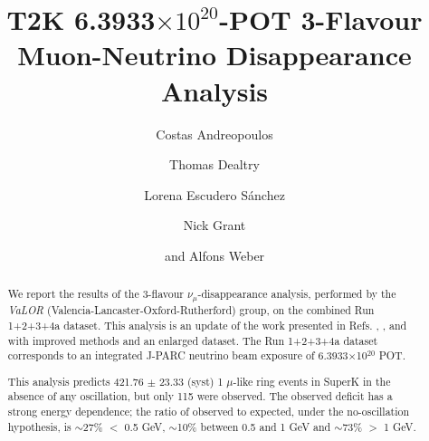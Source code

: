 %
%

\begin{frontmatter}

\title{
  T2K 6.3933$\times10^{20}$-POT 3-Flavour Muon-Neutrino Disappearance Analysis
}

\vspace*{0.7cm}

\author[RAL]     {Costas Andreopoulos}
\author[RAL,OXF] {Thomas Dealtry}
\author[IFIC]    {Lorena Escudero S\'anchez}
\author[LANCS]   {Nick Grant}
\author[RAL,OXF] {and Alfons Weber}

\address[RAL]{Particle Physics Dept., Rutherford Appleton Laboratory, STFC \\
              Harwell Oxford Campus\\
              Oxfordshire OX11 0QX, UK}

\address[OXF]{Subdepartment of Particle Physics, University of Oxford \\
              Denys Wilkinson Building, Keble Road\\
              Oxfordshire OX1 3RH, UK}

\address[IFIC]{Instituto de Fisica Corpuscular\\
              CSIC and University of Valencia\\
              Valencia, Spain}

\address[LANCS]{Physics Dept., Lancaster University \\
              Lancaster, LA1 4YB, UK}

%
%

\begin{abstract}

We report the results of the
3-flavour $\nu_{\mu}$-disappearance analysis,
performed by the {\em VaLOR} (Valencia-Lancaster-Oxford-Rutherford) group,
on the combined Run 1+2+3+4a dataset.
This analysis is an update of the work presented in
Refs. \cite{OurRun1DisappAnalysis}, \cite{OurRun12DisappAnalysis}, 
\cite{OurRun12DisappAnalysis3Flavour} and \cite{OurRun123DisappAnalysis3Flavour}
with improved methods and an enlarged dataset.
The Run 1+2+3+4a dataset corresponds to an integrated J-PARC neutrino beam
exposure of 6.3933$\times$10$^{20}$ POT.

This analysis predicts 421.76 $\pm$ 23.33 (syst)
1 $\mu$-like ring events in SuperK in the absence of any oscillation,
but only 115 were observed. The observed deficit has a strong energy dependence;
the ratio of observed to expected, under the no-oscillation hypothesis, is
$\sim$27\% $<$ 0.5 GeV, 
$\sim$10\% between 0.5 and 1 GeV and 
$\sim$73\% $>$ 1 GeV.


\end{abstract}
\end{frontmatter}
